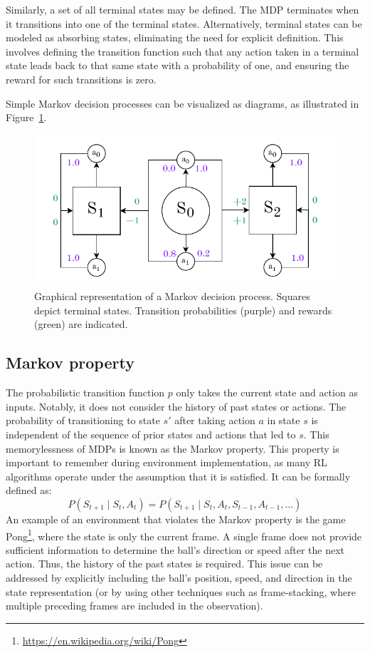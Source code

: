 \documentclass[
  digital,     %
  oneside,     %
  nosansbold,  %
  nocolorbold, %
  lof,         %
  lot,         %
]{fithesis4}
\begin{document}
Similarly, a set of all terminal states may be defined. The MDP terminates when it transitions into one of the terminal states. Alternatively, terminal states can be modeled as absorbing states, eliminating the need for explicit definition. This involves defining the transition function such that any action taken in a terminal state leads back to that same state with a probability of one, and ensuring the reward for such transitions is zero.

Simple Markov decision processes can be visualized as diagrams, as illustrated in Figure~\ref{fig:mdp}.

\begin{figure}[h]
    \centering
    \includegraphics[width=1\linewidth]{diagrams/mdp.pdf}
    \caption{Graphical representation of a Markov decision process. Squares depict terminal states. Transition probabilities (purple) and rewards (green) are indicated.}
    \label{fig:mdp}
\end{figure}

\subsection{Markov property}
\label{subsec:markov_property}
The probabilistic transition function $p$ only takes the current state and action as inputs. Notably, it does not consider the history of past states or actions. The probability of transitioning to state $s'$ after taking action $a$ in state $s$ is independent of the sequence of prior states and actions that led to $s$. This memorylessness of MDPs is known as the Markov property. This property is important to remember during environment implementation, as many RL algorithms operate under the assumption that it is satisfied. It can be formally defined as:
\begin{equation}
P(S_{t+1}\mid S_t,A_t)=P(S_{t+1}\mid S_t,A_t,S_{t-1},A_{t-1}, \dotsc)
\end{equation}
An example of an environment that violates the Markov property is the game Pong\footnote{\url{https://en.wikipedia.org/wiki/Pong}}, where the state is only the current frame. A single frame does not provide sufficient information to determine the ball’s direction or speed after the next action. Thus, the history of the past states is required. This issue can be addressed by explicitly including the ball’s position, speed, and direction in the state representation (or by using other techniques such as frame-stacking, where multiple preceding frames are included in the observation).
\end{document}

